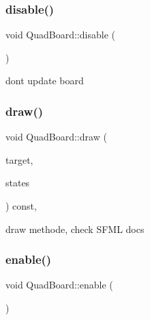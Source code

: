 \mbox{\label{classQuadBoard_aaa5d7e08e743372676a74d26e0806506}} 
\subsubsection{\texorpdfstring{disable()}{disable()}}
{\footnotesize\ttfamily void Quad\+Board\+::disable (\begin{DoxyParamCaption}{ }\end{DoxyParamCaption})\hspace{0.3cm}{\ttfamily [inline]}}



dont update board 

\mbox{\label{classQuadBoard_a40468c9832e6bbbdf3231fddc60a8521}} 
\subsubsection{\texorpdfstring{draw()}{draw()}}
{\footnotesize\ttfamily void Quad\+Board\+::draw (\begin{DoxyParamCaption}\item[{sf\+::\+Render\+Target \&}]{target,  }\item[{sf\+::\+Render\+States}]{states }\end{DoxyParamCaption}) const\hspace{0.3cm}{\ttfamily [private]}, {\ttfamily [virtual]}}



draw methode, check S\+F\+ML docs 

\mbox{\label{classQuadBoard_aa35b8ed541a1e56bd720bce2d73c5211}} 
\subsubsection{\texorpdfstring{enable()}{enable()}}
{\footnotesize\ttfamily void Quad\+Board\+::enable (\begin{DoxyParamCaption}{ }\end{DoxyParamCaption})\hspace{0.3cm}{\ttfamily [inline]}}




